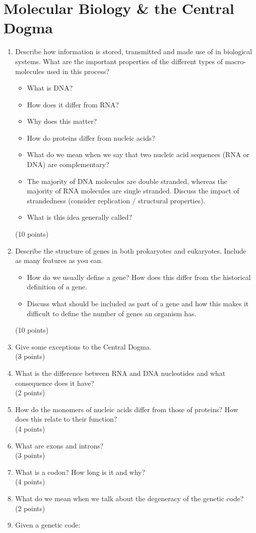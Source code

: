 \documentclass[11pt]{article}
\begin{document}
\section{Molecular Biology \& the Central Dogma}  
\begin{enumerate}
\item Describe how information is stored, transmitted and made use of in biological
  systems. What are the important properties of the different types of
  macro-molecules used in this process?
  \begin{itemize}
    \item What is DNA?
    \item How does it differ from RNA?
    \item Why does this matter?
    \item How do proteins differ from nucleic acids?
    \item What do we mean when we say that two nucleic acid sequences (RNA or
      DNA) are complementary?
    \item The majority of DNA molecules are double stranded, whereas the
      majority of RNA molecules are single stranded. Discuss the impact of
      strandedness (consider replication / structural properties).
    \item What is this idea generally called?
  \end{itemize}
  (10 points)
\item Describe the structure of genes in both prokaryotes and
  eukaryotes. Include as many features as you can.
  \begin{itemize}
  \item How do we usually define a gene? How does this differ
    from the historical definition of a gene.
  \item Discuss what should be included as part of a gene
    and how this makes it difficult to define the number of genes an organism
    has.
  \end{itemize}
  (10 points)
\item Give some exceptions to the Central Dogma.\\
(3 points)
\item What is the difference between RNA and DNA nucleotides and what
  consequence does it have?\\
(2 points)
\item How do the monomers of nucleic acids differ from those of proteins? How
  does this relate to their function?\\
(4 points)
\item What are exons and introns?\\
(3 points)
\item What is a codon? How long is it and why?\\
(4 points)
\item What do we mean when we talk about the degeneracy of the genetic code?\\
(2 points)
\item Given a genetic code:\\
  \begin{minipage}{0.6\textwidth}
  {\tiny
    
  }
  \end{minipage}


\end{enumerate}
\end{document}
